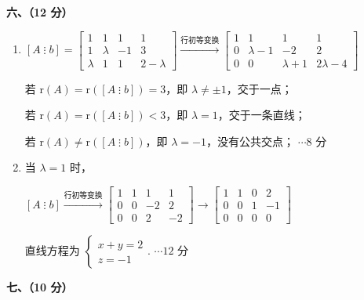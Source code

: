 \documentclass[a4paper,11pt]{ctexart}
\newcommand{\rk}{\mathrm{r}}
\newcommand{\score}[1]{\hfill$\cdots\text{#1 分}$}
\begin{document}
\vspace{1.0em}

\textbf{六、（12 分）}

\begin{enumerate}[label=(\arabic*), leftmargin=2.4em, itemsep=0.4em, topsep=0.3em]
  \item $[A \;\vdots\; b] = \left[\begin{array}{ccc|c} 1 & 1 & 1 & 1 \\ 1 & \lambda & -1 & 3 \\ \lambda & 1 & 1 & 2-\lambda \end{array}\right] \xrightarrow{\text{行初等变换}} \left[\begin{array}{ccc|c} 1 & 1 & 1 & 1 \\ 0 & \lambda-1 & -2 & 2 \\ 0 & 0 & \lambda+1 & 2\lambda-4 \end{array}\right]$

  若 $\rk(A) = \rk([A \;\vdots\; b]) = 3$，即 $\lambda \neq \pm 1$，交于一点；

  若 $\rk(A) = \rk([A \;\vdots\; b]) < 3$，即 $\lambda = 1$，交于一条直线；

  若 $\rk(A) \neq \rk([A \;\vdots\; b])$，即 $\lambda = -1$，没有公共交点； \score{8}

  \item 当 $\lambda = 1$ 时，

  $[A \;\vdots\; b] \xrightarrow{\text{行初等变换}} \left[\begin{array}{ccc|c} 1 & 1 & 1 & 1 \\ 0 & 0 & -2 & 2 \\ 0 & 0 & 2 & -2 \end{array}\right] \to \left[\begin{array}{ccc|c} 1 & 1 & 0 & 2 \\ 0 & 0 & 1 & -1 \\ 0 & 0 & 0 & 0 \end{array}\right]$

  直线方程为 $\begin{cases} x + y = 2 \\ z = -1 \end{cases}$. \score{12}
\end{enumerate}

\vspace{1.0em}

\textbf{七、（10 分）}
\end{document}
